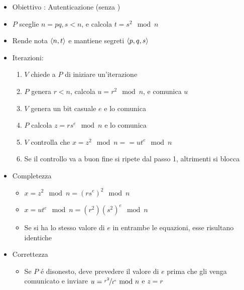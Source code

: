 \begin{itemize}
    \item Obiettivo : Autenticazione (senza )
    \item $P$ sceglie $n = pq, s < n$, e calcola $t = s^2 \mod{n}$
    \item Rende nota $\abracket{n, t}$ e mantiene segreti $\abracket{p,q,s}$
    \item Iterazioni:
    \begin{enumerate}
        \item $V$ chiede a $P$ di iniziare un'iterazione
        \item $P$ genera $r < n$, calcola $u = r^2 \mod{n}$, e comunica $u$
        \item $V$ genera un bit casuale $e$ e lo comunica
        \item $P$ calcola $z = rs^e \mod{n}$ e lo comunica
        \item $V$ controlla che $x = z^2 \mod{n} == ut^e \mod{n}$
        \item Se il controllo va a buon fine si ripete dal passo 1, altrimenti si blocca
    \end{enumerate} 
    \item Completezza
    \begin{itemize}
        \item $x = z^2 \mod{n} = (rs^e)^2 \mod{n}$
        \item $x = ut^e \mod{n} = (r^2)(s^2)^e \mod{n}$
        \item Se si ha lo stesso valore di $e$ in entrambe le equazioni, esse risultano identiche
    \end{itemize}
    \item Correttezza
    \begin{itemize}
        \item Se $P$ \'e disonesto, deve prevedere il valore di $e$ prima che gli venga comunicato e inviare $u = \nicefrac{r^2}{t^e} \mod{n}$ e $z = r$
    \end{itemize}
\end{itemize}